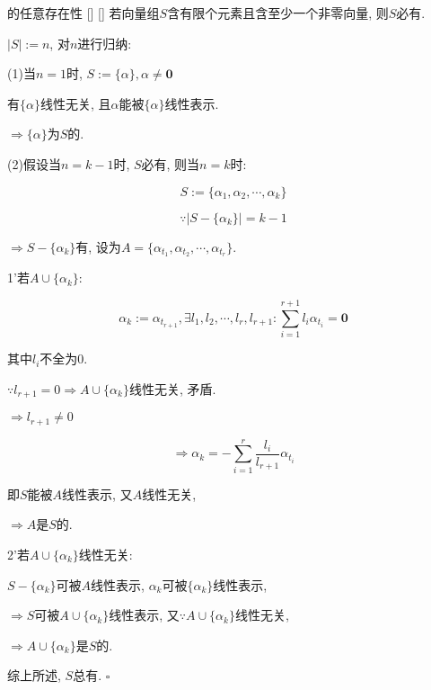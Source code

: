 \documentclass[UTF8]{ctexart}
\begin{document}
		\begin{ppt}
			[]
			{ 的任意存在性}
			[]
			[]
			若向量组$S$含有限个元素且含至少一个非零向量, 则$S$必有. 
			
		\end{ppt}
		\begin{prf}
		
			$|S|:=n$, 对$n$进行归纳: 
			
			(1)当$n=1$时, $S:=\{\alpha\}, \alpha \neq \mathbf{0}$
			
			有$\{\alpha\}$线性无关, 且$\alpha$能被$\{\alpha\}$线性表示. 
			
			$\Longrightarrow\{\alpha\}$为$S$的. 
			
			(2)假设当$n=k-1$时, $S$必有, 则当$n=k$时: 
			
			$$S:=\{\alpha_{1}, \alpha_{2}, \cdots, \alpha_{k}\}$$
			
			$$\because|S-\{\alpha_{k}\}|=k-1$$
			
			$\Longrightarrow S-\{\alpha_{k}\}$有, 设为$A=\{\alpha_{t_{1}}, \alpha_{t_{2}}, \cdots, \alpha_{t_{r}}\}$. 
			
			1'若$A\cup \{\alpha_{k}\}$ : 
			
			$$\alpha_{k}:=\alpha_{t_{r+1}},\exists l_{1},l_{2},\cdots,l_{r},l_{r+1}: \sum_{i=1}^{r+1}l_{i}\alpha_{t_{i}}=\mathbf{0}$$
			
			其中$l_{i}$不全为0. 
			
			$\because l_{r+1}=0\Longrightarrow A\cup \{\alpha_{k}\}$线性无关, 矛盾. 
			
			$\Longrightarrow l_{r+1}\neq 0$
			
			$$\Longrightarrow\alpha_{k}=-\sum_{i=1}^{r}\frac{l_{i}}{l_{r+1}}\alpha_{t_{i}}$$
			
			即$S$能被$A$线性表示, 又$A$线性无关, 
			
			$\Longrightarrow A$是$S$的. 
			
			2'若$A\cup \{\alpha_{k}\}$线性无关:
			
			$S-\{\alpha_{k}\}$可被$A$线性表示, $\alpha_{k}$可被$\{\alpha_{k}\}$线性表示, 
			
			$\Longrightarrow S$可被$A\cup \{\alpha_{k}\}$线性表示, 又$\because A\cup \{\alpha_{k}\}$线性无关, 
			
			$\Longrightarrow A\cup \{\alpha_{k}\}$是$S$的. 
			
			综上所述, $S$总有. $\square$
		\end{prf}
  
\end{document}
